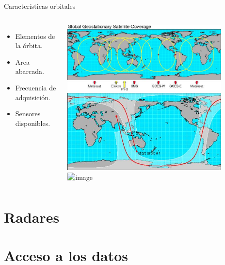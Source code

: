 \documentclass{beamer}
\begin{document}
\begin{frame}{Características orbitales}
	\begin{columns}
		\begin{itemize}
			\item Elementos de la órbita.
			\item Area abarcada.
			\item Frecuencia de adquisición.
			\item Sensores disponibles.
		\end{itemize}
		\includegraphics[width=0.85\textwidth]{IMGs/geoestat}\\
		\includegraphics[width=0.85\textwidth]{IMGs/polar1}\\
		\includegraphics<2>[width=0.85\textwidth]{IMGs/polar2}
	\end{columns}
\end{frame}



\section{Radares}

\section{Acceso a los datos}
\end{document}
